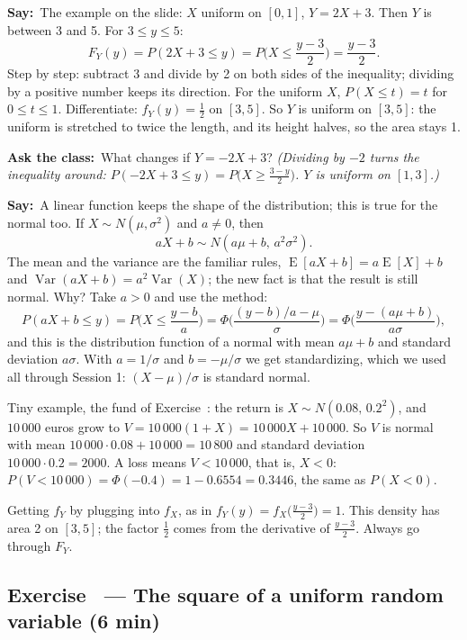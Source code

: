 \documentclass[11pt,a4paper,parskip=half]{scrartcl}
\renewcommand{\needspace}[1]{\Needspace{6\baselineskip}}
\newcommand{\E}{\operatorname{E}}
\newcommand{\Var}{\operatorname{Var}}
\newcommand{\say}{\textbf{\color{teal}Say:}\ }
\newcommand{\ask}{\textbf{\color{navy}Ask the class:}\ }
\begin{document}
\say The example on the slide: $X$ uniform on $[0,1]$, $Y=2X+3$. Then $Y$
is between 3 and 5. For $3\le y\le5$:
\[ F_Y(y)=P(2X+3\le y)=P\Big(X\le\frac{y-3}{2}\Big)=\frac{y-3}{2}. \]
Step by step: subtract 3 and divide by 2 on both sides of the inequality;
dividing by a positive number keeps its direction. For the uniform $X$,
$P(X\le t)=t$ for $0\le t\le1$. Differentiate: $f_Y(y)=\tfrac12$ on
$[3,5]$. So $Y$ is uniform on $[3,5]$: the uniform is stretched to twice
the length, and its height halves, so the area stays 1.

\ask What changes if $Y=-2X+3$? \emph{(Dividing by $-2$ turns the
inequality around: $P(-2X+3\le y)=P\big(X\ge\frac{3-y}{2}\big)$. $Y$ is
uniform on $[1,3]$.)}

\say A linear function keeps the shape of the distribution; this is true
for the normal too. If $X\sim N(\mu,\sigma^2)$ and $a\ne0$, then
\[ aX+b\sim N(a\mu+b,\,a^2\sigma^2). \]
The mean and the variance are the familiar rules, $\E[aX+b]=a\E[X]+b$ and
$\Var(aX+b)=a^2\Var(X)$; the new fact is that the result is still normal.
Why? Take $a>0$ and use the method:
\[ P(aX+b\le y)=P\Big(X\le\frac{y-b}{a}\Big)
	=\Phi\bigg(\frac{(y-b)/a-\mu}{\sigma}\bigg)
	=\Phi\bigg(\frac{y-(a\mu+b)}{a\sigma}\bigg), \]
and this is the distribution function of a normal with mean $a\mu+b$ and
standard deviation $a\sigma$. With $a=1/\sigma$ and $b=-\mu/\sigma$ we get
standardizing, which we used all through Session 1: $(X-\mu)/\sigma$ is
standard normal.

Tiny example, the fund of Exercise~: the return is
$X\sim N(0.08,\,0.2^2)$, and $10\,000$ euros grow to
$V=10\,000(1+X)=10\,000X+10\,000$. So $V$ is normal with mean
$10\,000\cdot0.08+10\,000=10\,800$ and standard deviation
$10\,000\cdot0.2=2000$. A loss means $V<10\,000$, that is, $X<0$:
$P(V<10\,000)=\Phi(-0.4)=1-0.6554=0.3446$, the same as $P(X<0)$.

\begin{mistake}
	Getting $f_Y$ by plugging into $f_X$, as in $f_Y(y)=f_X\big(\frac{y-3}{2}\big)=1$.
	This density has area 2 on $[3,5]$; the factor $\frac12$ comes from the
	derivative of $\frac{y-3}{2}$. Always go through $F_Y$.
\end{mistake}

\needspace{0.25\textheight}
\subsection{Exercise~ --- The square of a uniform random variable (6 min)}
\end{document}
